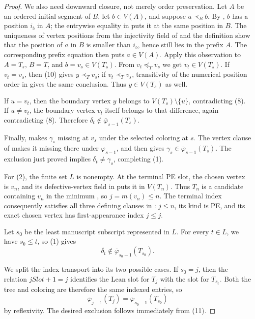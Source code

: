 \begin{proof}
We also need downward closure, not merely order preservation.  Let \(A\)
be an ordered initial segment of \(B\), let \(b\in V(A)\), and suppose
\(a\prec_B b\).  By , \(b\) has a position
\(i_b\) in \(A\); the entrywise equality in
 puts it at the same position in
\(B\).  The uniqueness of vertex positions from the injectivity field of
 and the definition  show
that the position of \(a\) in \(B\) is smaller than \(i_b\), hence still
lies in the prefix \(A\).  The corresponding prefix equation then puts
\(a\in V(A)\).  Apply this observation to \(A=T_s\), \(B=T\), and
\(b=v_s\in V(T_s)\).  From \(v_t\preceq_Tv_s\) we get
\(v_t\in V(T_s)\).  If \(v_t=v_s\), then (10) gives \(y\prec_Tv_s\);
if \(v_t\prec_Tv_s\), transitivity of the numerical position order in
 gives the same conclusion.  Thus
\(y\in V(T_s)\) as well.

If \(u=v_t\), then the boundary vertex \(y\) belongs to
\(V(T_s)\setminus\{u\}\), contradicting (8).  If \(u\ne v_t\), the
boundary vertex \(v_t\) itself belongs to that difference, again
contradicting (8).  Therefore
\(\delta_t\notin\overline\varphi_{s-1}(T_s)\).

Finally,  makes \(\gamma_s\) missing at
\(v_s\) under the selected coloring at \(s\).  The vertex clause of
 makes it missing there under
\(\varphi_{s-1}\), and  then gives
\(\gamma_s\in\overline\varphi_{s-1}(T_s)\).  The exclusion just proved
implies \(\delta_t\ne\gamma_s\), completing (1).

For (2), the finite set \(L\) is nonempty.  At the terminal PE slot, the
chosen vertex is \(v_n\), and its defective-vertex field in
 puts it in \(V(T_n)\).  Thus \(T_n\) is
a candidate containing \(v_n\) in the minimum
, so \(j=m(v_n)\leq n\).  The terminal
index consequently satisfies all three defining clauses in
: \(j\leq n\), its kind is PE, and
its exact chosen vertex has first-appearance index \(j\leq j\).

Let \(s_0\) be the least manuscript subscript represented in \(L\).
For every \(t\in L\), we have \(s_0\leq t\), so (1) gives
\[
        \delta_t\notin\overline\varphi_{s_0-1}(T_{s_0}).        \tag{11}
\]

We split the index transport into its two possible cases.  If \(s_0=j\),
then the relation \(jSlot+1=j\) identifies the Lean slot for \(T_j\) with
the slot for \(T_{s_0}\).  Both the tree and coloring are therefore the
same indexed entries, so
\[
 \overline\varphi_{j-1}(T_j)
   =\overline\varphi_{s_0-1}(T_{s_0})
\]
by reflexivity.  The desired exclusion follows immediately from (11).


\end{proof}
